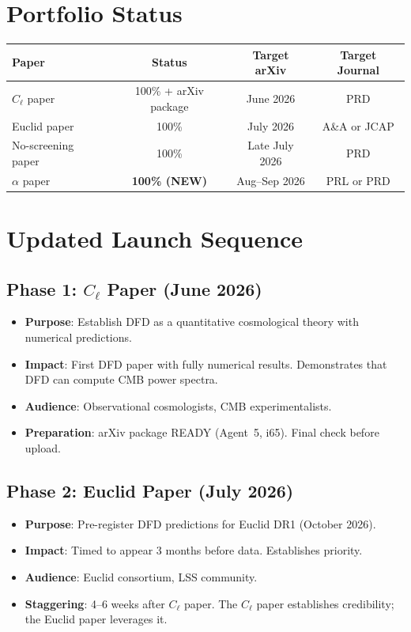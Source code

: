 \documentclass[11pt,a4paper]{article}
\begin{document}
\section{Portfolio Status}

\begin{center}
\begin{tabular}{lccc}
\toprule
\textbf{Paper} & \textbf{Status} & \textbf{Target arXiv} & \textbf{Target Journal} \\
\midrule
$C_\ell$ paper & 100\% + arXiv package & June 2026 & PRD \\
Euclid paper & 100\% & July 2026 & A\&A or JCAP \\
No-screening paper & 100\% & Late July 2026 & PRD \\
$\alpha$ paper & \textbf{100\% (NEW)} & Aug--Sep 2026 & PRL or PRD \\
\bottomrule
\end{tabular}
\end{center}

\section{Updated Launch Sequence}

\subsection{Phase 1: $C_\ell$ Paper (June 2026)}

\begin{itemize}
\item \textbf{Purpose}: Establish DFD as a quantitative cosmological theory with numerical predictions.
\item \textbf{Impact}: First DFD paper with fully numerical results. Demonstrates that DFD can compute CMB power spectra.
\item \textbf{Audience}: Observational cosmologists, CMB experimentalists.
\item \textbf{Preparation}: arXiv package READY (Agent~5, i65). Final check before upload.
\end{itemize}

\subsection{Phase 2: Euclid Paper (July 2026)}

\begin{itemize}
\item \textbf{Purpose}: Pre-register DFD predictions for Euclid DR1 (October 2026).
\item \textbf{Impact}: Timed to appear 3 months before data. Establishes priority.
\item \textbf{Audience}: Euclid consortium, LSS community.
\item \textbf{Staggering}: 4--6 weeks after $C_\ell$ paper. The $C_\ell$ paper establishes credibility; the Euclid paper leverages it.
\end{itemize}
\end{document}
